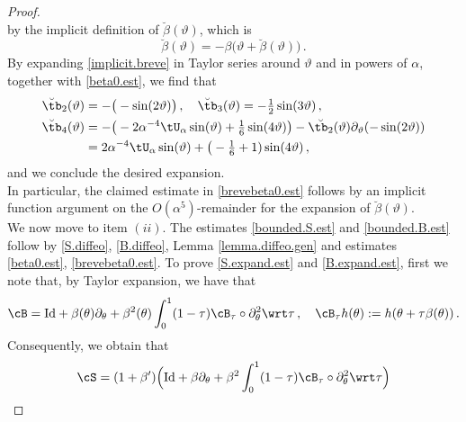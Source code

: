 \documentclass[a4paper,reqno,10pt]{article}
\newcommand{\pa}{\partial}
\begin{document}
\begin{proof}
$$    $$ by the implicit definition of $\breve{\beta}(\vartheta)$, which is
	\begin{equation}\label{implicit.breve}
		\breve{\beta}(\vartheta) = - \beta\big(\vartheta+ \breve{\beta}(\vartheta)\big) \,.
	\end{equation}
	By expanding \eqref{implicit.breve} in Taylor series around $\vartheta$ and in powers of $\alpha$, together with \eqref{beta0.est}, we find that
	\begin{equation}
		\begin{aligned}
			\breve\tb_{2}(\vartheta) & =- \big(- \sin(2\vartheta)\big)\,, \quad \breve\tb_{3}(\vartheta) = - \tfrac12 \sin(3\vartheta) \,, \\
			 \breve\tb_{4}(\vartheta) & = - \big(-2\alpha^{-4}\tU_{\alpha} \sin(\vartheta) + \tfrac{1}{6} \sin(4\vartheta) \big)  - \breve{\tb_{2}}(\vartheta)  \pa_{\vartheta}(-\sin(2\vartheta))  \\
		&	= 2\alpha^{-4}\tU_{\alpha} \sin(\vartheta) +  \big(-\tfrac{1}{6}+1) \sin(4\vartheta) \,,
		\end{aligned}
	\end{equation}
and we conclude the desired expansion.\\	In particular, the claimed estimate in \eqref{brevebeta0.est} follows by an implicit function argument on the $O(\alpha^5)$-remainder for the expansion of $\breve{\beta}(\vartheta)$.
	\\
	We now move to item $(ii)$. The estimates \eqref{bounded.S.est} and \eqref{bounded.B.est} follow by \eqref{S.diffeo}, \eqref{B.diffeo}, Lemma \ref{lemma.diffeo.gen} and estimates \eqref{beta0.est}, \eqref{brevebeta0.est}.  To prove \eqref{S.expand.est} and \eqref{B.expand.est}, first we note that, by Taylor expansion, we have that
	\begin{equation}\label{B.Taylor}
	\cB = {\rm Id} + \beta(\theta) \pa_{\theta} + \beta^2(\theta)  \int_{0}^{1} (1-\tau) \cB_{\tau}\circ \pa_{\theta}^2 \wrt\tau \,, \quad \cB_{\tau}h(\theta):= h(\theta+\tau\beta(\theta)) \,.
\end{equation}
	Consequently, we obtain that
	\begin{align}
		\cS & = (1+\beta ') \Big( {\rm Id} + \beta \pa_{\theta} + \beta ^2 \int_{0}^{1} (1-\tau) \cB_{\tau}\circ \pa_{\theta}^2 \wrt\tau \Big) \\

\end{align}
\end{proof}
\end{document}
